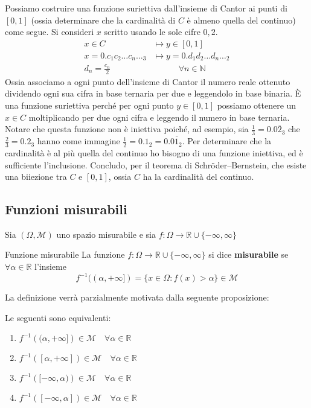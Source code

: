 \begin{example}
    Possiamo costruire una funzione suriettiva
    dall'insieme di Cantor ai punti di \([0, 1]\) (ossia determinare che la cardinalità di \(C\) è almeno quella del continuo) come segue. Si consideri \(x\) scritto usando le sole cifre \(0, 2\). 
    \begin{align*}
        x \in C &\longmapsto y \in [0, 1] \\
        x = 0.c_{1}c_{2}\dots c_{n}\dots_3 &\longmapsto y =
        0.d_{1}d_{2}\dots d_{n}\dots_2 \\
        d_{n} = \frac{c_{n}}{2} \,&\quad\quad\quad \forall n \in \mathbb{N}
    \end{align*}
    Ossia associamo a ogni punto dell'insieme di Cantor il numero reale ottenuto
    dividendo ogni sua cifra in base ternaria per due e leggendolo in base
    binaria. È una funzione suriettiva perché per ogni punto \(y \in [0, 1]\) possiamo
    ottenere un \(x \in C\) moltiplicando per due ogni cifra e leggendo il
    numero in base ternaria. Notare che questa funzione non è iniettiva poiché,
    ad esempio, sia \(\frac{1}{3} = 0.0\overline{2}_3\) che \(\frac{2}{3} =
    0.2_3\) hanno come immagine \(\frac{1}{2} = 0.1_2 = 0.0\overline{1}_2\). Per
    determinare che la cardinalità è al più quella del continuo ho bisogno di
    una funzione iniettiva, ed è sufficiente l'inclusione. Concludo, per il
    teorema di Schröder–Bernstein, che esiste una biiezione tra \(C\) e \(
    [0,1]\), ossia \(C\) ha la cardinalità del continuo. 
\end{example}
\subsection{Funzioni misurabili}
Sia \((\Omega, \mathcal{M})\) uno spazio misurabile e sia \(f: \Omega \to
\mathbb{R} \cup \{-\infty, \infty\}\) 
\begin{definition}{Funzione misurabile}
    La funzione \(f : \Omega \to \mathbb{R} \cup \{-\infty, \infty \}\) si dice \textbf{misurabile} se \(\forall \alpha \in \mathbb{R}\) l'insieme
    \[
        f^{-1}((\alpha, +\infty]) = \{x \in \Omega : f(x) > \alpha\} \in \mathcal{M}
    \]
\end{definition}
La definizione verrà parzialmente motivata dalla seguente proposizione:
\begin{proposition}
    Le seguenti sono equivalenti:
\begin{enumerate}[label = \roman*)]
    \item \(f ^{-1}\left((\alpha, +\infty]\right) \in \mathcal{M} \quad \forall \alpha \in \mathbb{R}\)
    \item \(f ^{-1}\left([\alpha, +\infty]\right) \in \mathcal{M} \quad \forall \alpha \in
        \mathbb{R}\)
    \item \(f ^{-1}\left([-\infty, \alpha)\right) \in \mathcal{M} \quad \forall \alpha \in
        \mathbb{R}\)
    \item \(f ^{-1}\left([-\infty, \alpha]\right) \in \mathcal{M} \quad \forall \alpha \in 
        \mathbb{R}\) 
\end{enumerate}
\end{proposition}

